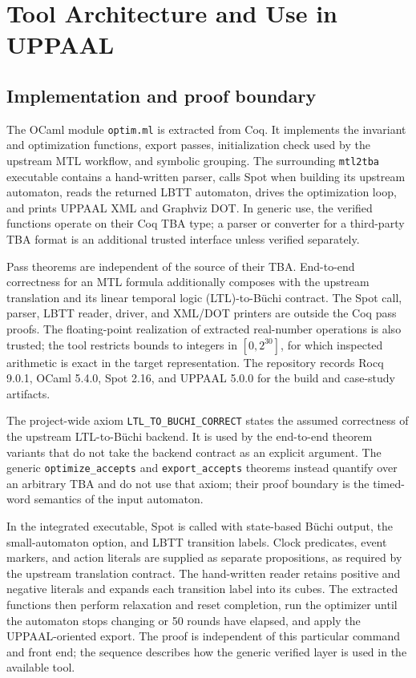 \documentclass{ieeeaccess}
\begin{document}


\section{Tool Architecture and Use in UPPAAL}
\label{sec:toolchain}
\subsection{Implementation and proof boundary}
The OCaml module \texttt{optim.ml} is extracted from Coq. It implements the invariant and optimization functions, export passes, initialization check used by the upstream MTL workflow, and symbolic grouping. The surrounding \texttt{mtl2tba} executable contains a hand-written parser, calls Spot when building its upstream automaton, reads the returned LBTT automaton, drives the optimization loop, and prints UPPAAL XML and Graphviz DOT. In generic use, the verified functions operate on their Coq TBA type; a parser or converter for a third-party TBA format is an additional trusted interface unless verified separately.

Pass theorems are independent of the source of their TBA. End-to-end correctness for an MTL formula additionally composes with the upstream translation and its linear temporal logic (LTL)-to-B\"uchi contract. The Spot call, parser, LBTT reader, driver, and XML/DOT printers are outside the Coq pass proofs. The floating-point realization of extracted real-number operations is also trusted; the tool restricts bounds to integers in $[0,2^{30}]$, for which inspected arithmetic is exact in the target representation. The repository records Rocq 9.0.1, OCaml 5.4.0, Spot 2.16, and UPPAAL 5.0.0 for the build and case-study artifacts.

The project-wide axiom \texttt{LTL\_TO\_BUCHI\_CORRECT} states the assumed
correctness of the upstream LTL-to-B\"uchi backend. It is used by the
end-to-end theorem variants that do not take the backend contract as an
explicit argument. The generic \texttt{optimize\_accepts} and
\texttt{export\_accepts} theorems instead quantify over an arbitrary TBA and
do not use that axiom; their proof boundary is the timed-word semantics of
the input automaton.

In the integrated executable, Spot is called with state-based B\"uchi output,
the small-automaton option, and LBTT transition labels. Clock predicates,
event markers, and action literals are supplied as separate propositions, as
required by the upstream translation contract. The hand-written reader
retains positive and negative literals and expands each transition label into
its cubes. The extracted functions then perform relaxation and reset
completion, run the optimizer until the automaton stops changing or 50 rounds
have elapsed, and apply the UPPAAL-oriented export. The proof is independent
of this particular command and front end; the sequence describes how the
generic verified layer is used in the available tool.
\end{document}
